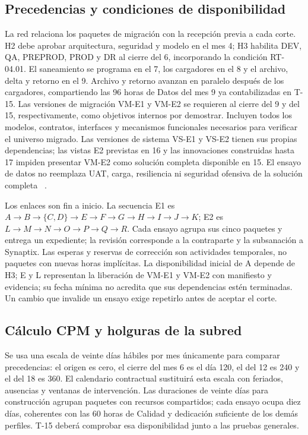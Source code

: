 \subsection{Precedencias y condiciones de disponibilidad}
La red relaciona los paquetes de migración con la recepción previa a cada corte. H2 debe aprobar arquitectura, seguridad y modelo en el mes 4; H3 habilita DEV, QA, PREPROD, PROD y DR al cierre del 6, incorporando la condición RT-04.01. El saneamiento se programa en el 7, los cargadores en el 8 y el archivo, delta y retorno en el 9. Archivo y retorno avanzan en paralelo después de los cargadores, compartiendo las 96 horas de Datos del mes 9 ya contabilizadas en T-15. Las versiones de migración VM-E1 y VM-E2 se requieren al cierre del 9 y del 15, respectivamente, como objetivos internos por demostrar. Incluyen todos los modelos, contratos, interfaces y mecanismos funcionales necesarios para verificar el universo migrado. Las versiones de sistema VS-E1 y VS-E2 tienen sus propias dependencias; las vistas E2 previstas en 16 y las innovaciones construidas hasta 17 impiden presentar VM-E2 como solución completa disponible en 15. El ensayo de datos no reemplaza UAT, carga, resiliencia ni seguridad ofensiva de la solución completa \parencite[Formulario~E-25; art.~18; pp.~13--74]{bases-admin}~\parencite[RT-04.01; pp.~10--11]{bases-transversales}.

Los enlaces son fin a inicio. La secuencia E1 es $A\to B\to\{C,D\}\to E\to F\to G\to H\to I\to J\to K$; E2 es $L\to M\to N\to O\to P\to Q\to R$. Cada ensayo agrupa sus cinco paquetes y entrega un expediente; la revisión corresponde a la contraparte y la subsanación a Synaptix. Las esperas y reservas de corrección son actividades temporales, no paquetes con nuevas horas implícitas. La disponibilidad inicial de A depende de H3; E y L representan la liberación de VM-E1 y VM-E2 con manifiesto y evidencia; su fecha mínima no acredita que sus dependencias estén terminadas. Un cambio que invalide un ensayo exige repetirlo antes de aceptar el corte.

\subsection{Cálculo CPM y holguras de la subred}
Se usa una escala de veinte días hábiles por mes únicamente para comparar precedencias: el origen es cero, el cierre del mes 6 es el día 120, el del 12 es 240 y el del 18 es 360. El calendario contractual sustituirá esta escala con feriados, ausencias y ventanas de intervención. Las duraciones de veinte días para construcción agrupan paquetes con recursos compartidos; cada ensayo ocupa diez días, coherentes con las 60 horas de Calidad y dedicación suficiente de los demás perfiles. T-15 deberá comprobar esa disponibilidad junto a las pruebas generales.

